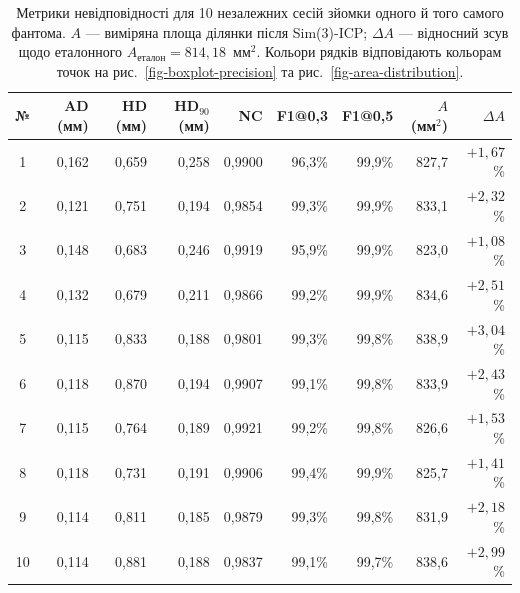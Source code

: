 \begin{table}[!tp]
\centering
\small
\begin{tabular}{crrrrrrrr}
\toprule
№ & AD (мм) & HD (мм) & HD$_{90}$ (мм) & NC & F1@0,3 & F1@0,5 & $A$ (мм$^2$) & $\Delta A$ \\
\midrule
\rowcolor{tab1!18}   1  & 0,162 & 0,659 & 0,258 & 0,9900 & 96,3\% & 99,9\% & 827,7 & $+1{,}67$\% \\
\rowcolor{tab2!18}   2  & 0,121 & 0,751 & 0,194 & 0,9854 & 99,3\% & 99,9\% & 833,1 & $+2{,}32$\% \\
\rowcolor{tab3!18}   3  & 0,148 & 0,683 & 0,246 & 0,9919 & 95,9\% & 99,9\% & 823,0 & $+1{,}08$\% \\
\rowcolor{tab4!18}   4  & 0,132 & 0,679 & 0,211 & 0,9866 & 99,2\% & 99,9\% & 834,6 & $+2{,}51$\% \\
\rowcolor{tab5!18}   5  & 0,115 & 0,833 & 0,188 & 0,9801 & 99,3\% & 99,8\% & 838,9 & $+3{,}04$\% \\
\rowcolor{tab6!18}   6  & 0,118 & 0,870 & 0,194 & 0,9907 & 99,1\% & 99,8\% & 833,9 & $+2{,}43$\% \\
\rowcolor{tab7!18}   7  & 0,115 & 0,764 & 0,189 & 0,9921 & 99,2\% & 99,8\% & 826,6 & $+1{,}53$\% \\
\rowcolor{tab8!18}   8  & 0,118 & 0,731 & 0,191 & 0,9906 & 99,4\% & 99,9\% & 825,7 & $+1{,}41$\% \\
\rowcolor{tab9!18}   9  & 0,114 & 0,811 & 0,185 & 0,9879 & 99,3\% & 99,8\% & 831,9 & $+2{,}18$\% \\
\rowcolor{tab10c!18} 10 & 0,114 & 0,881 & 0,188 & 0,9837 & 99,1\% & 99,7\% & 838,6 & $+2{,}99$\% \\
\bottomrule
\end{tabular}
\caption{Метрики невідповідності для 10 незалежних сесій зйомки одного й того самого фантома. $A$ --- виміряна площа ділянки після Sim(3)-ICP; $\Delta A$ --- відносний зсув щодо еталонного $A_{\text{еталон}} = 814{,}18$~мм$^2$. Кольори рядків відповідають кольорам точок на рис.~\ref{fig-boxplot-precision} та рис.~\ref{fig-area-distribution}.}
\label{tbl-accuracy}
\end{table}
